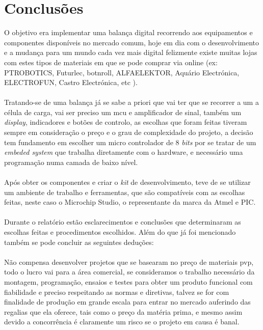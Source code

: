 \chapter{Conclusões}
O objetivo era implementar uma balança digital recorrendo aos equipamentos e componentes disponíveis no mercado comum, hoje em dia com o desenvolvimento e a mudança para um mundo cada vez mais digital felizmente existe muitas lojas com estes tipos de materiais em que se pode comprar via online (ex: PTROBOTICS, Futurlec, botnroll, ALFAELEKTOR, Aquário Electrónica, ELECTROFUN, Castro Electrónica, etc ).
\\
\\
Tratando-se de uma balança já se sabe a priori que vai ter que se recorrer a um a célula de carga, vai ser preciso um \acs{mcu} e amplificador de sinal, também um \textit{display}, indicadores e botões de controlo, as escolhas que foram feitas tiveram sempre em consideração o preço e o grau de complexidade do projeto, a decisão tem fundamento em escolher um micro controlador de 8 \textit{bits} por se tratar de um \textit{embeded system} que trabalha diretamente com o hardware, e necessário uma programação numa camada de baixo nível.
\\
\\
Após obter os componentes e criar o \textit{kit} de desenvolvimento, teve de se utilizar um ambiente de trabalho e ferramentas, que são compatíveis com as escolhas feitas, neste caso o Microchip Studio, o representante da marca da Atmel e PIC.
\\
\\
Durante o relatório estão esclarecimentos e conclusões que determinaram as escolhas feitas e procedimentos escolhidos. Além do que já foi mencionado também se pode concluir as seguintes deduções:
\\
\\
Não compensa desenvolver projetos que se basearam no preço de materiais \ac{pvp}, todo o lucro vai para a área comercial, se consideramos o trabalho necessário da montagem, programação, ensaios e testes para obter um produto funcional com fiabilidade e preciso respeitando as normas e diretivas, talvez se for com finalidade de produção em grande escala para entrar no mercado auferindo das regalias que ela oferece, tais como o preço da matéria prima, e mesmo assim devido a concorrência é claramente um risco se o projeto em causa é banal.
